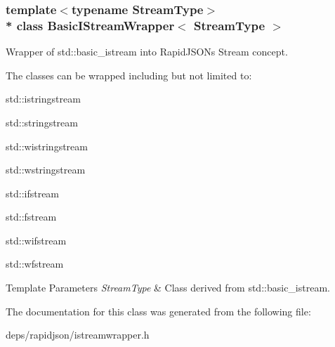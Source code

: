 \subsubsection*{template$<$typename Stream\+Type$>$\\*
class Basic\+I\+Stream\+Wrapper$<$ Stream\+Type $>$}

Wrapper of {\ttfamily std\+::basic\+\_\+istream} into Rapid\+J\+S\+ON\textquotesingle{}s Stream concept. 

The classes can be wrapped including but not limited to\+:


\begin{DoxyItemize}
\item {\ttfamily std\+::istringstream} 
\item {\ttfamily std\+::stringstream} 
\item {\ttfamily std\+::wistringstream} 
\item {\ttfamily std\+::wstringstream} 
\item {\ttfamily std\+::ifstream} 
\item {\ttfamily std\+::fstream} 
\item {\ttfamily std\+::wifstream} 
\item {\ttfamily std\+::wfstream} 
\end{DoxyItemize}


\begin{DoxyTemplParams}{Template Parameters}
{\em Stream\+Type} & Class derived from {\ttfamily std\+::basic\+\_\+istream}. \\
\hline
\end{DoxyTemplParams}


The documentation for this class was generated from the following file\+:\begin{DoxyCompactItemize}
\item 
deps/rapidjson/istreamwrapper.\+h\end{DoxyCompactItemize}
